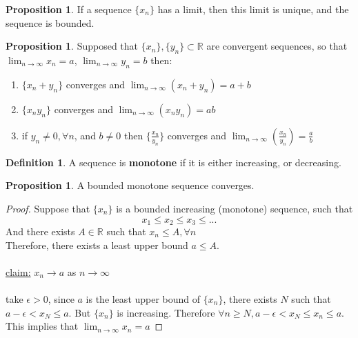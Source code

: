 \documentclass[12pt]{article}
\theoremstyle{plain}
\theoremstyle{definition}
\newtheorem{definition}[theorem]{Definition}
\newtheorem{proposition}[theorem]{Proposition}
\begin{document}
\begin{proposition}
    If a sequence $\{x_n \}$ has a limit, then this limit is unique, and the sequence is bounded.
\end{proposition}

\begin{proposition}
    Supposed that $\{x_n \} , \{y_n \} \subset \mathbb{R} $ are convergent sequences, so that $\lim_{n\to\infty} x_n = a$, $\lim_{n\to\infty} y_n = b$ then:
    \begin{enumerate}
        \item $\{x_n + y_n \}$ converges and $\lim_{n\to\infty} (x_n + y_n) = a+b$
        \item $\{x_n y_n \}$ converges and $\lim_{n\to\infty} (x_n y_n) = ab$
        \item if $y_n \neq 0, \forall n$, and $b\neq 0$ then $\{\frac{x_n}{y_n} \}$ converges and $\lim_{n\to\infty} ( \frac{x_n}{y_n}) = \frac{a}{b}$
    \end{enumerate}
\end{proposition}

\begin{definition}
    A sequence is \textbf{monotone} if it is either increasing, or decreasing.
\end{definition}

\begin{proposition}
    A bounded monotone sequence converges.
\end{proposition}

\begin{proof}
    Suppose that $\{x_n \}$ is a bounded increasing (monotone) sequence, such that
    $$x_1 \leq x_2 \leq x_3 \leq ...$$
    And there exists $A\in\mathbb{R}$ such that $x_n \leq A, \forall n$\\
    Therefore, there exists a least upper bound $a \leq A$.\\
    \\
    \underline{claim:} $x_n \to a$ as $n \to \infty$\\
    \\
    take $\epsilon > 0$, since $a$ is the least upper bound of $\{ x_n \}$, there exists $N$ such that $a-\epsilon < x_N \leq a$. But $\{ x_n \}$ is increasing. Therefore $\forall n \geq N, a-\epsilon < x_N \leq x_n \leq a$. This implies that $\lim_{n\to\infty} x_n = a$
\end{proof}
\
\end{document}
